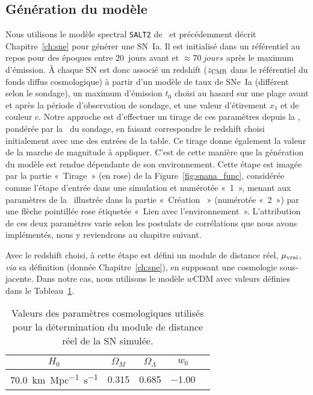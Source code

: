 \documentclass[../main/main.tex]{subfiles}
\begin{document}
\subsection{Génération du modèle}\label{ssec:simsn}

Nous utilisons le modèle spectral \texttt{SALT2} de~\cite{guy2007} et
précédemment décrit Chapitre~\ref{ch:sne} pour générer une SN~Ia. Il est
initialisé dans un référentiel au repos pour des époques entre \SI{20}{jours}
avant et $\approx\SI{70}{jours}$ après le maximum d'émission. À chaque SN est
donc associé un redshift ($z_{\rm CMB}$ dans le référentiel du fonds diffus
cosmologique) à partir d'un modèle de taux de SNe~Ia (différent selon le
sondage), un maximum d'émission $t_0$ choisi au hasard sur une plage avant et
après la période d'observation de sondage, et une valeur d'étirement $x_1$ et de
couleur $c$. Notre approche est d'effectuer un tirage de ces paramètres depuis
la \hostlib, pondérée par la \wgtmap\ du sondage, en faisant correspondre le
redshift choisi initialement avec une des entrées de la table. Ce tirage donne
également la valeur de la marche de magnitude à appliquer. C'est de cette
manière que la génération du modèle est rendue dépendante de son environnement.
Cette étape est imagée par la partie «~Tirage~» (en rose) de la
Figure~\ref{fig:snana_func}, considérée comme l'étape d'entrée dans une
simulation et numérotée «~1~», menant aux paramètres de la \hostlib\ illustrée
dans la partie «~Création \hostlib~» (numérotée «~2~») par une flèche pointillée
rose étiquetée «~Lien avec l'environnement~». L'attribution de ces deux
paramètres varie selon les postulats de corrélations que nous avons implémentés,
nous y reviendrons au chapitre suivant.

Avec le redshift choisi, à cette étape est défini un module de distance réel,
$\mu_{\rm vrai}$, \textit{via} sa définition (donnée Chapitre~\ref{ch:sne}), en
supposant une cosmologie sous-jacente. Dans notre cas, nous utilisons le modèle
$w$CDM avec valeurs définies dans le Tableau~\ref{tab:cosmoinput}.

\begin{table}[ht]
    \centering
    \caption[Valeurs des paramètres cosmologiques utilisés pour la détermination
    du module de distance réel de la SN simulée]{Valeurs des paramètres
        cosmologiques utilisés pour la détermination du module de distance réel
    de la SN simulée.}
    \label{tab:cosmoinput}
    \begin{tabular}{ccccc}
        \toprule
        $H_0$ & $\Omega_M$ & $\Omega_\Lambda$ & $w_0$ \\
        \midrule
        \SI{70.0}{km.Mpc^{-1}.s^{-1}} & \num{0.315} & \num{0.685} & \num{-1.00}\\ 
        \bottomrule
    \end{tabular}
\end{table}
\end{document}
